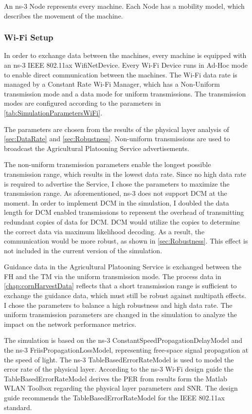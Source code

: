 An ns-3 Node represents every machine.
Each Node has a mobility model, which describes the movement of the machine.

\subsubsection*{Wi-Fi Setup}
In order to exchange data between the machines, every machine is equipped with an  ns-3 IEEE 802.11ax WifiNetDevice.
Every Wi-Fi Device runs in Ad-Hoc mode to enable direct communication
between the machines.
The Wi-Fi data rate is managed by a Constant Rate Wi-Fi Manager, which has a Non-Uniform
transmission mode and a data mode for uniform transmissions.
The transmission modes are configured according
to the parameters in \autoref{tab:SimulationParametersWiFi}.

The parameters are chosen from the results of the physical layer analysis of \autoref{sec:DataRate} and \autoref{sec:Robustness}.
Non-uniform transmissions are used to broadcast the Agricultural Platooning Service advertisements.

The non-uniform transmission parameters enable the longest possible
transmission range, which results in the lowest data rate.
Since no high data rate is required to advertise the Service, I chose the parameters to maximize the transmission range.
As aforementioned, ns-3 does not support \ac{DCM} at the moment.
In order to implement \ac{DCM} in the simulation, I doubled the data length for \ac{DCM} enabled transmissions to
represent the overhead of transmitting redundant copies of data for \ac{DCM}. \ac{DCM} would utilize the copies to determine the
correct data via maximum likelihood decoding.
As a result, the communication would be more robust, as shown in \autoref{sec:Robustness}.
This effect is not included in the current version of the simulation.

Guidance data in the Agricultural Platooning Service is exchanged between the \ac{FH} and the \ac{TM} via the
uniform transmission mode.
The process data in \autoref{chap:cornHarvestData} reflects that a short transmission range
is sufficient to exchange the guidance data, which must still be robust against multipath effects.
I chose the parameters to balance a high robustness and high data rate.
The uniform transmission parameters are changed in the simulation to analyze the impact on the network performance metrics.

The simulation is based on the ns-3 ConstantSpeedPropagationDelayModel and the  ns-3 FriisPropagationLossModel,
representing free-space signal propagation at the speed of light.
The ns-3 TableBasedErrorRateModel is used to model the error rate of the physical layer.
According to the ns-3 Wi-Fi design guide %
the TableBasedErrorRateModel derives the \ac{PER} from results form the Matlab WLAN Toolbox
regarding the physical layer parameters and \ac{SNR}.
The design guide recommends the TableBasedErrorRateModel for the IEEE 802.11ax standard.


